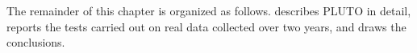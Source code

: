
The remainder of this chapter is organized as follows.
 describes PLUTO in detail,  reports the tests carried out on real data collected over two years, and  draws the conclusions.


